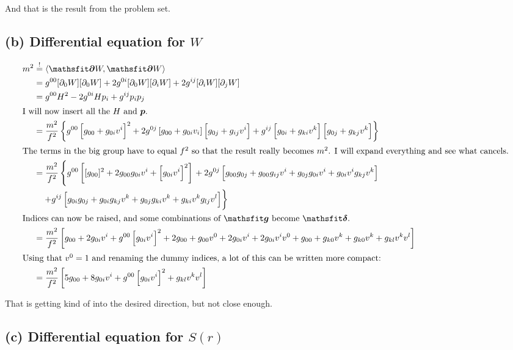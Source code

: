 And that is the result from the problem set.

\subsection*{(b) Differential equation for $W$}

\begin{align*}
    m^2
    &\overset != 
    \bracket{\tens \partial W, \tens \partial W} \\
    &= g^{00} [\partial_0 W] [\partial_0 W]
    + 2 g^{0i} [\partial_0 W] [\partial_i W]
    + 2 g^{ij} [\partial_i W] [\partial_j W]
    \\
    &= g^{00} H^2 - 2 g^{0i} H p_i + g^{ij} p_i p_j \\
    \intertext{%
        I will now insert all the $H$ and $\vec p$.
    }
    &= \frac{m^2}{f^2} \left\{ g^{00} \Group{g_{00} + g_{0i} v^i}^2 + 2 g^{0j}
    \Group{g_{00} + g_{0i} v_i}\Group{g_{0j} + g_{ij} v^i}
+ g^{ij} \Group{g_{0i} +
g_{ki} v^k} \Group{g_{0j} + g_{kj} v^k} \right\} \\
\intertext{%
    The terms in the big group have to equal $f^2$ so that the result really
    becomes $m^2$. I will expand everything and see what cancels.
}
&= \frac{m^2}{f^2} \left\{ g^{00} \Group{ [g_{00}]^2 + 2 g_{00} g_{0i} v^i + \Group{
g_{0i} v^i }^2 } \right.
+ 2 g^{0j} \Group{ g_{00} g_{0j} +
g_{00} g_{ij} v^i + g_{0j} g_{0i} v^i + g_{0i} v^i g_{kj} v^k }
\\ &\quad
\left. + g^{ij} \Group{ g_{0i} g_{0j} + g_{0i} g_{kj} v^k + g_{0j}
g_{ki} v^k + g_{ki} v^k g_{lj} v^l} \right\} \\
%
\intertext{%
    Indices can now be raised, and some combinations of $\tens g$ become $\tens
    \delta$.
}
&= \frac{m^2}{f^2} \Group{ g_{00} + 2 g_{0i} v^i + g^{00} \Group{ g_{0i} v^i }^2 
+ 2 g_{00} + g_{00} v^0 + 2 g_{0i} v^i + 2 g_{0i} v^i v^0
+ g_{00} + g_{k0} v^k + g_{k0} v^k + g_{kl} v^k v^l } \\
%
\intertext{%
    Using that $v^0 = 1$ and renaming the dummy indices, a lot of this can be
    written more compact:
}
&= \frac{m^2}{f^2} \Group{ 5 g_{00} + 8 g_{0i} v^i + g^{00} \Group{ g_{0i} v^i
}^2 + g_{kl} v^k v^l }
\end{align*}

That is getting kind of into the desired direction, but not close enough.

\subsection*{(c) Differential equation for $S(r)$}

